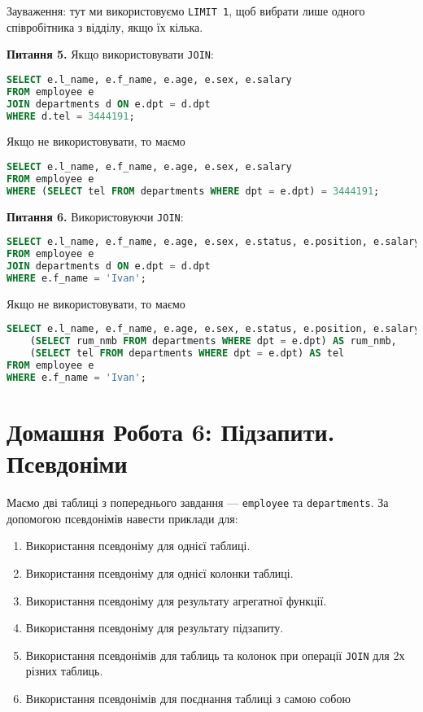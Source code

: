 \documentclass{hw_template}
\begin{document}
Зауваження: тут ми використовуємо \texttt{LIMIT 1}, щоб вибрати лише одного 
співробітника з відділу, якщо їх кілька. 

\textbf{Питання 5.} Якщо використовувати \texttt{JOIN}:
\begin{lstlisting}[language=SQL]
SELECT e.l_name, e.f_name, e.age, e.sex, e.salary
FROM employee e
JOIN departments d ON e.dpt = d.dpt
WHERE d.tel = 3444191;
\end{lstlisting}

Якщо не використовувати, то маємо
\begin{lstlisting}[language=SQL]
SELECT e.l_name, e.f_name, e.age, e.sex, e.salary
FROM employee e
WHERE (SELECT tel FROM departments WHERE dpt = e.dpt) = 3444191;
\end{lstlisting}

\textbf{Питання 6.} Використовуючи \texttt{JOIN}:
\begin{lstlisting}[language=SQL]
SELECT e.l_name, e.f_name, e.age, e.sex, e.status, e.position, e.salary, d.rum_nmb, d.tel
FROM employee e
JOIN departments d ON e.dpt = d.dpt
WHERE e.f_name = 'Ivan';
\end{lstlisting}

Якщо не використовувати, то маємо
\begin{lstlisting}[language=SQL]
SELECT e.l_name, e.f_name, e.age, e.sex, e.status, e.position, e.salary,
    (SELECT rum_nmb FROM departments WHERE dpt = e.dpt) AS rum_nmb,
    (SELECT tel FROM departments WHERE dpt = e.dpt) AS tel
FROM employee e
WHERE e.f_name = 'Ivan';
\end{lstlisting}

\newpage

\section{Домашня Робота 6: Підзапити. Псевдоніми}

\begin{problem}
    Маємо дві таблиці з попереднього завдання --- \texttt{employee} та \texttt{departments}.
    За допомогою псевдонімів навести приклади для:
    \begin{enumerate}
        \item Використання псевдоніму для однієї таблиці.
        \item Використання псевдоніму для однієї колонки таблиці.
        \item Використання псевдоніму для результату агрегатної функції.
        \item Використання псевдоніму для результату підзапиту.
        \item Використання псевдонімів для таблиць та колонок при операції \texttt{JOIN} для 2х різних таблиць.
        \item Використання псевдонімів для поєднання таблиці з самою собою
    \end{enumerate}
\end{problem}
\end{document}
